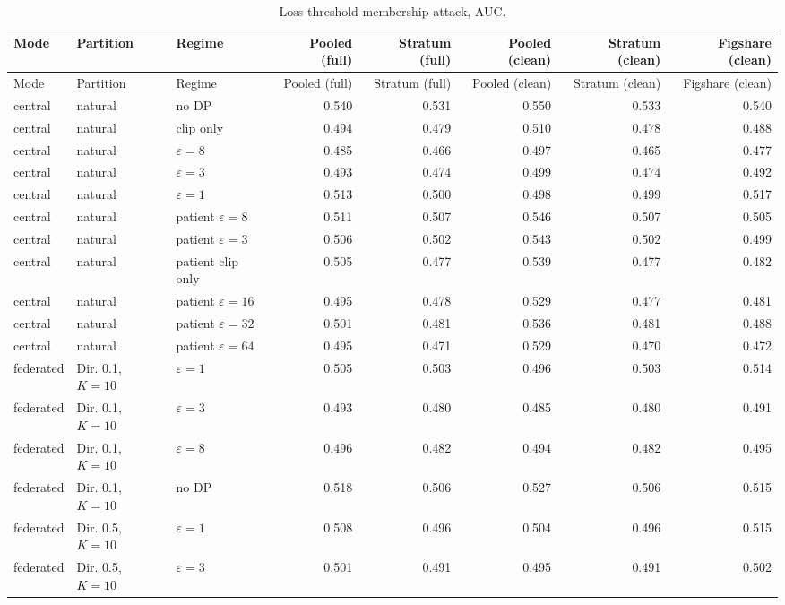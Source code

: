 {\scriptsize
\begin{longtable}{lllrrrrr}
\caption{Loss-threshold membership attack, AUC.}\label{tab:s_loss_mia}\\
\toprule
Mode & Partition & Regime & Pooled (full) & Stratum (full) & Pooled (clean) & Stratum (clean) & Figshare (clean) \\
\midrule
\endfirsthead
\toprule
Mode & Partition & Regime & Pooled (full) & Stratum (full) & Pooled (clean) & Stratum (clean) & Figshare (clean) \\
\midrule
\endhead
\bottomrule
\endlastfoot
central & natural & no DP & 0.540 & 0.531 & 0.550 & 0.533 & 0.540 \\
central & natural & clip only & 0.494 & 0.479 & 0.510 & 0.478 & 0.488 \\
central & natural & $\varepsilon=8$ & 0.485 & 0.466 & 0.497 & 0.465 & 0.477 \\
central & natural & $\varepsilon=3$ & 0.493 & 0.474 & 0.499 & 0.474 & 0.492 \\
central & natural & $\varepsilon=1$ & 0.513 & 0.500 & 0.498 & 0.499 & 0.517 \\
central & natural & patient $\varepsilon=8$ & 0.511 & 0.507 & 0.546 & 0.507 & 0.505 \\
central & natural & patient $\varepsilon=3$ & 0.506 & 0.502 & 0.543 & 0.502 & 0.499 \\
central & natural & patient clip only & 0.505 & 0.477 & 0.539 & 0.477 & 0.482 \\
central & natural & patient $\varepsilon=16$ & 0.495 & 0.478 & 0.529 & 0.477 & 0.481 \\
central & natural & patient $\varepsilon=32$ & 0.501 & 0.481 & 0.536 & 0.481 & 0.488 \\
central & natural & patient $\varepsilon=64$ & 0.495 & 0.471 & 0.529 & 0.470 & 0.472 \\
federated & Dir. 0.1, $K{=}10$ & $\varepsilon=1$ & 0.505 & 0.503 & 0.496 & 0.503 & 0.514 \\
federated & Dir. 0.1, $K{=}10$ & $\varepsilon=3$ & 0.493 & 0.480 & 0.485 & 0.480 & 0.491 \\
federated & Dir. 0.1, $K{=}10$ & $\varepsilon=8$ & 0.496 & 0.482 & 0.494 & 0.482 & 0.495 \\
federated & Dir. 0.1, $K{=}10$ & no DP & 0.518 & 0.506 & 0.527 & 0.506 & 0.515 \\
federated & Dir. 0.5, $K{=}10$ & $\varepsilon=1$ & 0.508 & 0.496 & 0.504 & 0.496 & 0.515 \\
federated & Dir. 0.5, $K{=}10$ & $\varepsilon=3$ & 0.501 & 0.491 & 0.495 & 0.491 & 0.502 \\

\end{longtable}}

